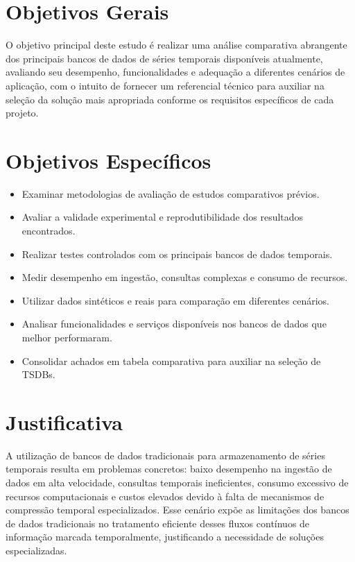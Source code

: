 \section{Objetivos Gerais}

O objetivo principal deste estudo é realizar uma análise comparativa abrangente dos principais bancos de dados de séries temporais disponíveis atualmente, avaliando seu desempenho, funcionalidades e adequação a diferentes cenários de aplicação, com o intuito de fornecer um referencial técnico para auxiliar na seleção da solução mais apropriada conforme os requisitos específicos de cada projeto.

\section{Objetivos Específicos}

\begin{itemize}
    \item Examinar metodologias de avaliação de estudos comparativos prévios.
    \item Avaliar a validade experimental e reprodutibilidade dos resultados encontrados.
    \item Realizar testes controlados com os principais bancos de dados temporais.
    \item Medir desempenho em ingestão, consultas complexas e consumo de recursos.
    \item Utilizar dados sintéticos e reais para comparação em diferentes cenários.
    \item Analisar funcionalidades e serviços disponíveis nos bancos de dados que melhor performaram.
    \item Consolidar achados em tabela comparativa para auxiliar na seleção de TSDBs.
\end{itemize}

\section{Justificativa}

A utilização de bancos de dados tradicionais para armazenamento de séries temporais resulta em problemas concretos: baixo desempenho na ingestão de dados em alta velocidade, consultas temporais ineficientes, consumo excessivo de recursos computacionais e custos elevados devido à falta de mecanismos de compressão temporal especializados. Esse cenário expõe as limitações dos bancos de dados tradicionais no tratamento eficiente desses fluxos contínuos de informação marcada temporalmente, justificando a necessidade de soluções especializadas.

